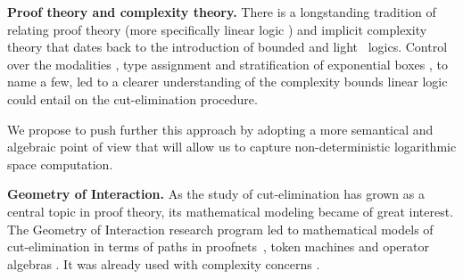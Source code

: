 \textbf{Proof theory and complexity theory.}
There is a longstanding tradition of relating proof theory (more specifically linear logic \cite{girard_linear_1987}) and implicit complexity theory that dates back to the introduction of bounded \cite{Girard1992} and light~\cite{girard_light_1994} logics.
Control over the modalities \cite{schopp_stratified_2007,Lago2010}, %
type assignment \cite{gaboardi_logical_2008} and stratification of exponential boxes \cite{baillot_linear_2010}, to name a few, led to a clearer understanding of the complexity bounds linear logic could entail on the cut-elimination procedure.

We propose to push further this approach by adopting a more semantical and algebraic point of view that will allow us to capture non-deterministic logarithmic space computation.

\smallskip\noindent
\textbf{Geometry of Interaction.}
As the study of cut-elimination has grown as a central topic in proof theory, its mathematical modeling became of great interest.
The Geometry of Interaction \cite{girard_towards_1989} research program led to mathematical models of cut-elimination in terms of paths in proofnets~\cite{asperti_paths_1994}, token machines \cite{laurent_token_2001} and operator algebras \cite{girard_geometry_1989}.
It was already used with complexity concerns \cite{baillot_elementary_2001,girard_normativity_2012}. %

